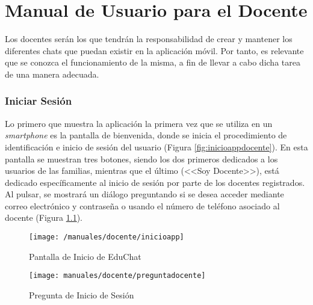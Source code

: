 \chapter{Manual de Usuario para el Docente}
\label{chap:mandocente}

Los docentes serán los que tendrán la responsabilidad de crear y mantener los diferentes chats que puedan existir en la aplicación móvil. Por tanto, es relevante que se conozca el funcionamiento de la misma, a fin de llevar a cabo dicha tarea de una manera adecuada.

\subsection*{Iniciar Sesión}
Lo primero que muestra la aplicación la primera vez que se utiliza en un \textit{smartphone} es la pantalla de bienvenida, donde se inicia el procedimiento de identificación e inicio de sesión del usuario (Figura \ref{fig:inicioappdocente}). En esta pantalla se muestran tres botones, siendo los dos primeros dedicados a los usuarios de las familias, mientras que el último (<<Soy Docente>>), está dedicado específicamente al inicio de sesión por parte de los docentes registrados. Al pulsar, se mostrará un diálogo preguntando si se desea acceder mediante correo electrónico y contraseña o usando el número de teléfono asociado al docente (Figura \ref{fig:preguntadocente}).

\begin{figure}[!h]
	\centering
	\begin{minipage}{.5\textwidth}
		\centering
		\texttt{[image: /manuales/docente/inicioapp]}
		\caption{Pantalla de Inicio de EduChat}
		\label{fig:inicioappdocente}
	\end{minipage}%
	\begin{minipage}{.5\textwidth}
		\centering
		\texttt{[image: manuales/docente/preguntadocente]}
		\caption{Pregunta de Inicio de Sesión}
		\label{fig:preguntadocente}
	\end{minipage}
\end{figure}

\clearpage

